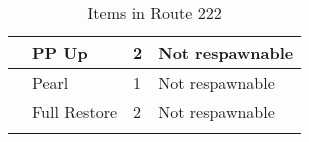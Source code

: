 \begin{longtable}{|| l l l l ||}%
\hline%
&PP Up&2&Not respawnable\\%
\hline%
&Pearl&1&Not respawnable\\%
\hline%
&Full Restore&2&Not respawnable\\%
\hline%
\endhead%
\hline%
\caption{Items in Route 222}%
\label{tab:Route222Items}%
\end{longtable}
